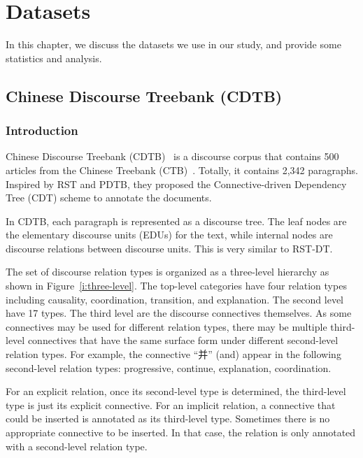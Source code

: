 %
%
%
\chapter{Datasets}
\label{c:datasets}

In this chapter, we discuss the datasets we use in our study, and
provide some statistics and analysis.

\section{Chinese Discourse Treebank (CDTB)}
\label{c:CDTB}
\subsection{Introduction}

Chinese Discourse Treebank (CDTB)~\citep{li2014building} is a discourse
corpus that contains 500 articles from the Chinese Treebank (CTB)~\citep{xue2005penn}.
Totally, it contains 2,342 paragraphs.
Inspired by RST and PDTB, they proposed the Connective-driven Dependency Tree (CDT)
scheme to annotate the documents.

In CDTB, each paragraph is represented as a discourse tree. The leaf nodes are the
elementary discourse units (EDUs) for the text, while internal nodes are discourse
relations between discourse units. This is very similar to RST-DT.

The set of discourse relation types is organized as a three-level hierarchy as
shown in Figure~\ref{i:three-level}.
The top-level categories have four relation types including causality, coordination,
transition, and explanation. The second level
have 17 types. The third level are the discourse connectives themselves.
As some connectives may be used for different relation types, there may
be multiple third-level connectives that have the same surface form under
different second-level relation types. For example, the connective
``并'' (and) appear in the following second-level relation types:
progressive, continue, explanation, coordination.



For an explicit relation, once its second-level type is determined, the
third-level type is just its explicit connective. For an implicit relation,
a connective that could be inserted is annotated as its third-level type.
Sometimes there is no appropriate connective to be inserted. In that case,
the relation is only annotated with a second-level relation type.

